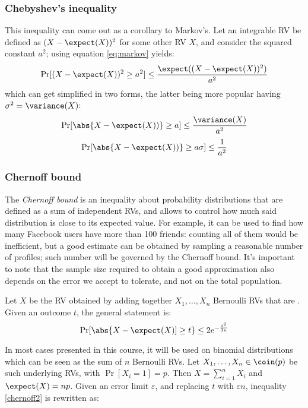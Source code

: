 \subsubsection{Chebyshev's inequality}

This inequality can come out as a corollary to Markov's. Let an integrable RV be defined as $(X - \expect(X))^2$ for some other RV $X$, and consider the squared constant $a^2$; using equation \ref{eq:markov} yields:
\[
    \Pr[(X - \expect(X))^2 \geq a^2] \leq \frac{\expect((X - \expect(X))^2)}{a^2}
\]
which can get simplified in two forms, the latter being more popular having $\sigma^2 = \variance(X)$:
\begin{equation}\label{eq:chebyshev2}
    \Pr[\abs{X - \expect(X))} \geq a] \leq \frac{\variance(X)}{a^2}
\end{equation}
\begin{equation}\label{eq:chebyshev}
    \Pr[\abs{X - \expect(X))} \geq a \sigma] \leq \frac{1}{a^2}
\end{equation}


\subsubsection{Chernoff bound}

The \emph{Chernoff bound} is an inequality about probability distributions that are defined as a sum of independent RVs, and allows to control how much said distribution is close to its expected value. For example, it can be used to find how many Facebook users have more than 100 friends: counting all of them would be inefficient, but a good estimate can be obtained by sampling a reasonable number of profiles; such number will be governed by the Chernoff bound. It's important to note that the sample size required to obtain a good approximation also depends on the error we accept to tolerate, and not on the total population.

\begin{definition}
    Let $X$ be the RV obtained by adding together $X_1, \dots, X_n$ Bernoulli RVs that are \iid. Given an outcome $t$, the general statement is:
    \begin{equation}\label{chernoff2}
        \Pr[\abs{X - \expect(X)] \geq t} \leq 2e^{-\frac{t^2}{3n}}
    \end{equation}
\end{definition}

In most cases presented in this course, it will be used on binomial distributions which can be seen as the sum of $n$ \iid{} Bernoulli RVs. Let $X_1, \dots, X_n \in \coin(p)$ be such underlying RVs, with $\Pr[X_i = 1] = p$. Then $X = \sum_{i = 1}^{n} X_i$ and $\expect(X) = np$. Given an error limit $\varepsilon$, and replacing $t$ with $\varepsilon n$, inequality \ref{chernoff2} is rewritten as:

